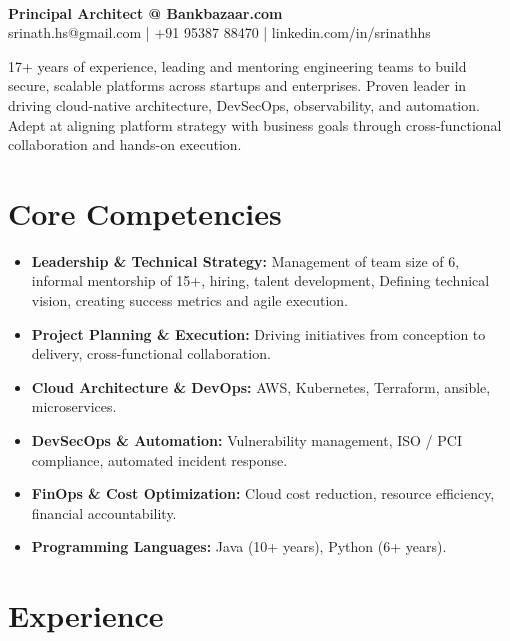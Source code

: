 \documentclass[11pt]{article}
\newcommand{\name}[1]{\noindent{\LARGE\sffamily\textbf{#1}}}
\begin{document}
\pagestyle{empty}
\color{bodytext}

\name{Srinath H S}\\[0.5em]
\textbf{Principal Architect @ Bankbazaar.com}\\[0.3em]
srinath.hs@gmail.com \quad | \quad +91 95387 88470 \quad | \quad linkedin.com/in/srinathhs

17+ years of experience, leading and mentoring engineering teams to build secure, scalable platforms across startups and enterprises. Proven leader in driving cloud-native architecture, DevSecOps, observability, and automation. Adept at aligning platform strategy with business goals through cross-functional collaboration and hands-on execution.

\section*{Core Competencies}
\begin{itemize}[leftmargin=*, itemsep=-0.5em]
  \item \textbf{Leadership \& Technical Strategy:} Management of team size of 6, informal mentorship of 15+, hiring, talent development, Defining technical vision, creating success metrics and agile execution.
  \item \textbf{Project Planning \& Execution:} Driving initiatives from conception to delivery, cross-functional collaboration.
  \item \textbf{Cloud Architecture \& DevOps:} AWS, Kubernetes, Terraform, ansible, microservices.
  \item \textbf{DevSecOps \& Automation:} Vulnerability management, ISO / PCI compliance, automated incident response.
  \item \textbf{FinOps \& Cost Optimization:} Cloud cost reduction, resource efficiency, financial accountability.
  \item \textbf{Programming Languages:} Java (10+ years), Python (6+ years).
\end{itemize}

\section*{Experience}
\end{document}
